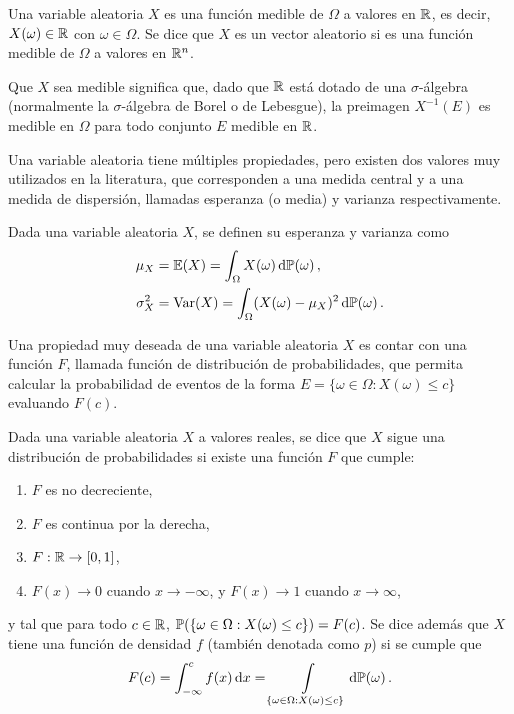 \begin{definition}
	Una variable aleatoria \(X\) es una función medible de \(\Omega\) a valores en \(\mathbb{R}\), es decir, \(X(\omega) \in \mathbb{R}\) con \(\omega \in \Omega\). Se dice que \(X\) es un vector aleatorio si es una función medible de \(\Omega\) a valores en \(\mathbb{R}^n\).
\end{definition}

Que \(X\) sea medible significa que, dado que \(\mathbb{R}\) está dotado de una \(\sigma\)-álgebra (normalmente la \(\sigma\)-álgebra de Borel o de Lebesgue), la preimagen \(X^{-1}(E)\) es medible en \(\Omega\) para todo conjunto \(E\) medible en \(\mathbb{R}\).

Una variable aleatoria tiene múltiples propiedades, pero existen dos valores muy utilizados en la literatura, que corresponden a una medida central y a una medida de dispersión, llamadas esperanza (o media) y varianza respectivamente.
\begin{definition}
	Dada una variable aleatoria \(X\), se definen su esperanza y varianza como
	\begin{align*}
		\mu_X		&= \mathbb{E}(X) = \int_\Omega X(\omega) \dd{\mathbb{P}(\omega)},\\
		\sigma_X^2	&= \operatorname{Var}(X) = \int_\Omega (X(\omega) - \mu_X)^2 \dd{\mathbb{P}(\omega)}.
	\end{align*}
\end{definition}

Una propiedad muy deseada de una variable aleatoria \(X\) es contar con una función \(F\), llamada función de distribución de probabilidades, que permita calcular la probabilidad de eventos de la forma \(E = \{\omega \in \Omega : X(\omega) \leq c\}\) evaluando \(F(c)\).

\begin{definition}
	Dada una variable aleatoria \(X\) a valores reales, se dice que \(X\) sigue una distribución de probabilidades si existe una función \(F\) que cumple:
	\begin{enumerate}
		\item \(F\) es no decreciente,
		\item \(F\) es continua por la derecha,
		\item \(F : \mathbb{R} \to [0,1]\),
		\item \(F(x) \to 0\) cuando \(x \to -\infty\), y \(F(x) \to 1\) cuando \(x \to \infty\),
	\end{enumerate}
	y tal que para todo \(c \in \mathbb{R}\), \(\mathbb{P}(\{\omega \in \Omega : X(\omega) \leq c\}) = F(c)\). Se dice además que \(X\) tiene una función de densidad \(f\) (también denotada como \(p\)) si se cumple que
	\begin{equation*}
		F(c) = \int_{-\infty}^c f(x) \dd{x} = \int\limits_{\{\omega \in \Omega : X(\omega) \leq c\}} \dd{\mathbb{P}(\omega)}.
	\end{equation*}
\end{definition}

